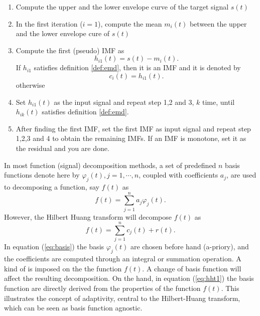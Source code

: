 \documentclass[../Main/thesis.tex]{subfiles}
\begin{document}
\begin{enumerate}
	\item Compute the upper and the lower envelope curve of the target signal $s(t)$
	\item In the first iteration ($i=1$), compute the mean $m_{i}(t)$ between the upper and the lower envelope cure of $s(t)$
	\item Compute the first (pseudo) IMF as 
	\begin{equation}\label{eq:proto}
		h_{i1}(t) = s(t)-m_{i}(t).
	\end{equation}
	If $h_{i1}$ satisfies definition \ref{def:emd}, then it is an IMF and it is denoted by 
	\begin{equation}\label{eq:imf}
		c_{i}(t) = h_{i1}(t).
	\end{equation}
	otherwise
	
	\item Set $h_{i1}(t)$ as the input signal and repeat step 1,2 and 3, $k$ time, until $h_{ik}(t)$ satisfies definition \ref{def:emd}.
	\item After finding the first IMF, set the first IMF as input signal and repeat step 1,2,3 and 4 to obtain the remaining IMFs. If an IMF is monotone, set it as the residual and you are done.
\end{enumerate}
 In most function (signal) decomposition methods, a set of predefined $n$ basis functions denote here by $\varphi_{j}(t), j = 1,\cdots,n$, coupled with coefficients $a_{j}$, are used to decomposing a function, say $f(t)$ as 
\begin{equation}\label{eq:basis}
	f(t) = \sum_{j=1}^{n}a_{j}\varphi_{j}(t).
\end{equation}
However, the Hilbert Huang transform will decompose $f(t)$ as 
\begin{equation}\label{eq:hht1}
f(t) = \sum_{j=1}^{n}c_{j}(t) + r(t).
\end{equation}
In equation (\ref{eq:basis}) the basis $\varphi_{j}(t)$ are chosen before hand (a-priory), and the coefficients are computed through an integral or summation operation. A kind of  is imposed on the the function $f(t)$. A change of basis function will affect the resulting decomposition. On the hand, in equation (\ref{eq:hht1}) the basis function are directly derived from the properties of the function $f(t)$. This illustrates the concept of adaptivity, central to the Hilbert-Huang transform, which can be seen as basis function agnostic.
\end{document}
